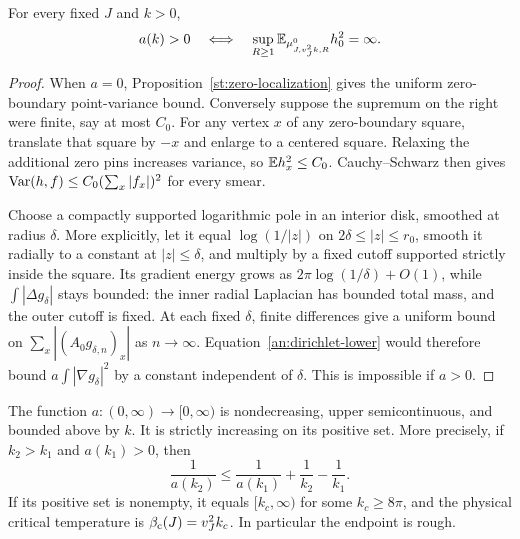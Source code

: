 \begin{corollary}\label{an:physical-criterion}
For every fixed $J$ and $k>0$,
\begin{equation}
 a(k)>0\quad\Longleftrightarrow\quad
 \sup_{R\ge1}\mathbb E_{\mu^0_{J,v_J^2k,R}}h_0^2=\infty.
 \label{an:physical-equivalence}
\end{equation}
\end{corollary}

\begin{proof}
When $a=0$, Proposition~\ref{st:zero-localization} gives the
uniform zero-boundary point-variance bound.  Conversely suppose
the supremum on the right were finite, say at most $C_0$.
For any vertex $x$ of any zero-boundary square, translate that
square by $-x$ and enlarge to a centered square.  Relaxing
the additional zero pins increases variance, so
$\mathbb E h_x^2\le C_0$.  Cauchy--Schwarz then gives
$\operatorname{Var}(h,f)\le C_0(\sum_x|f_x|)^2$ for every smear.

Choose a compactly supported logarithmic pole in an interior
disk, smoothed at radius $\delta$.  More explicitly, let it
equal $\log(1/|z|)$ on $2\delta\le|z|\le r_0$, smooth it
radially to a constant at $|z|\le\delta$, and multiply by a
fixed cutoff supported strictly inside the square.  Its
gradient energy grows as $2\pi\log(1/\delta)+O(1)$, while
$\int|\Delta g_\delta|$ stays bounded: the inner radial
Laplacian has bounded total mass, and the outer cutoff is
fixed.  At each fixed $\delta$, finite differences give a
uniform bound on $\sum_x|(A_0g_{\delta,n})_x|$ as
$n\to\infty$.  Equation~\eqref{an:dirichlet-lower} would
therefore bound $a\int|\nabla g_\delta|^2$ by a constant
independent of $\delta$.  This is impossible if $a>0$.
\end{proof}

\begin{proposition}
\label{an:coefficient-regularity}
The function $a:(0,\infty)\to[0,\infty)$ is nondecreasing,
upper semicontinuous, and bounded above by $k$.  It is strictly
increasing on its positive set.  More precisely, if $k_2>k_1$
and $a(k_1)>0$, then
\begin{equation}
 \frac1{a(k_2)}\le\frac1{a(k_1)}+
                                    \frac1{k_2}-\frac1{k_1}.
 \label{an:strict-growth}
\end{equation}
If its positive set is nonempty, it equals $[k_c,\infty)$
for some $k_c\ge8\pi$, and the physical critical temperature
is $\beta_{\mathrm c}(J)=v_J^2k_c$.  In particular the endpoint is rough.
\end{proposition}

